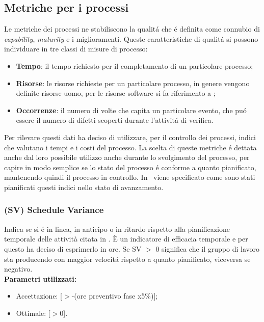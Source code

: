 \subsection{Metriche per i processi}
Le metriche dei processi ne stabiliscono la qualit\'a che \'e definita come connubio di \textit{capability}, \textit{maturity} e i miglioramenti. Queste caratteristiche di qualit\'a si possono individuare in tre classi di misure di processo:
\begin{itemize}
\item \textbf{Tempo}: il tempo richiesto per il completamento di un particolare processo;
\item \textbf{Risorse}: le risorse richieste per un particolare processo, in genere vengono definite risorse-uomo, per le risorse software si fa riferimento a \infoNDP;
\item \textbf{Occorrenze}: il numero di volte che capita un particolare evento, che pu\'o essere il numero di difetti scoperti durante l'attivit\'a di verifica.
\end{itemize}
Per rilevare questi dati \gruppo{} ha deciso di utilizzare, per il controllo dei processi, indici che valutano i tempi e i costi del processo. La scelta di queste metriche \'e dettata anche dal loro possibile utilizzo anche durante lo svolgimento del processo, per capire in modo semplice se lo stato del processo \'e conforme a quanto pianificato, mantenendo quindi il processo in controllo. In \infoPDP ~viene specificato come sono stati pianificati questi indici nello stato di avanzamento.
\subsubsection{(SV) Schedule Variance}
Indica se si \'e in linea, in anticipo o in ritardo rispetto alla pianificazione temporale delle attività citata in \infoPDP.
È un indicatore di efficacia temporale e per questo \gruppo ha deciso di esprimerlo in ore.
Se SV $>$ 0 significa che il gruppo di lavoro sta producendo con maggior velocit\'a rispetto a quanto pianificato, viceversa se negativo.\\
\textbf{Parametri utilizzati:}
\begin{itemize}
\item Accettazione: [$>$-(ore preventivo fase x5\%)];
\item Ottimale: [$>$0].
\end{itemize}

